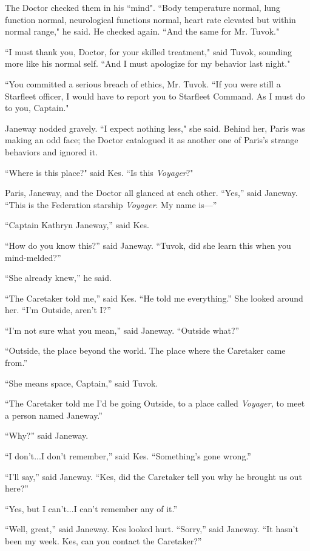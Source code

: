 \documentclass[twoside,letterpaper,12pt]{memoir}
\begin{document}
The Doctor checked them in his ``mind". ``Body temperature normal, lung function normal, neurological functions normal, heart rate elevated but within normal range," he said. He checked again. ``And the same for Mr. Tuvok." 

``I must thank you, Doctor, for your skilled treatment," said Tuvok, sounding more like his normal self. ``And I must apologize for my behavior last night." 

``You committed a serious breach of ethics, Mr. Tuvok. ``If you were still a Starfleet officer, I would have to report you to Starfleet Command. As I must do to you, Captain." 

Janeway nodded gravely. ``I expect nothing less," she said. Behind her, Paris was making an odd face; the Doctor catalogued it as another one of Paris's strange behaviors and ignored it. 

``Where is this place?" said Kes. ``Is this \textit{Voyager}?" 

Paris, Janeway, and the Doctor all glanced at each other. ``Yes,” said Janeway. ``This is the Federation starship \textit{Voyager}. My name is---” 

``Captain Kathryn Janeway,” said Kes. 

``How do you know this?” said Janeway. ``Tuvok, did she learn this when you mind-melded?” 

``She already knew,” he said. 

``The Caretaker told me,” said Kes. ``He told me everything.” She looked around her. ``I’m Outside, aren’t I?” 

``I’m not sure what you mean,” said Janeway. ``Outside what?” 

``Outside, the place beyond the world. The place where the Caretaker came from.” 

``She means space, Captain,” said Tuvok. 

``The Caretaker told me I’d be going Outside, to a place called \textit{Voyager, }to meet a person named Janeway.” 

``Why?” said Janeway. 

``I don’t...I don’t remember,” said Kes. ``Something’s gone wrong.” 

``I’ll say,” said Janeway. ``Kes, did the Caretaker tell you why he brought us out here?” 

``Yes, but I can’t...I can’t remember any of it.” 

``Well, great,” said Janeway. Kes looked hurt. ``Sorry,” said Janeway. ``It hasn’t been my week. Kes, can you contact the Caretaker?” 
\end{document}
